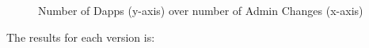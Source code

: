 \begin{figure}[t]
  \centering
      \qquad
  \caption{Number of Dapps (y-axis) over number of Admin Changes (x-axis) \label{fig:admin}}
\end{figure}
The results for each version is:
